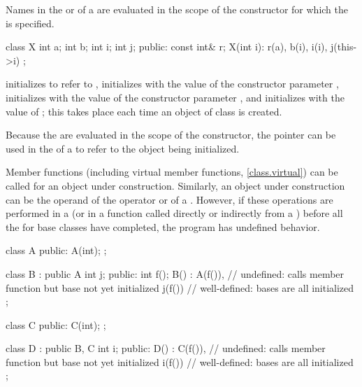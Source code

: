\pnum
{}%
Names in the
or 
of a
are evaluated in the scope of the constructor for which the
is specified.
\begin{example}

\begin{codeblock}
class X {
  int a;
  int b;
  int i;
  int j;
public:
  const int& r;
  X(int i): r(a), b(i), i(i), j(this->i) { }
};
\end{codeblock}

initializes
to refer to
,
initializes
with the value of the constructor parameter
,
initializes
with the value of the constructor parameter
,
and initializes
with the value of
;
this takes place each time an object of class
is created.
\end{example}
\begin{note}
Because the
are evaluated in the scope of the constructor, the
pointer can be used in the
of a
to refer to the object being initialized.
\end{note}

\pnum
{}%
Member functions (including virtual member functions, \ref{class.virtual}) can be
called for an object under construction.
Similarly, an object under construction can be the operand of the
operator or of a
.
However, if these operations are performed in a
(or in a function called directly or indirectly from a
)
before all the
for base classes have completed, the program has undefined behavior.
\begin{example}
\begin{codeblock}
class A {
public:
  A(int);
};

class B : public A {
  int j;
public:
  int f();
  B() : A(f()),     // undefined: calls member function but base  not yet initialized
  j(f()) { }        // well-defined: bases are all initialized
};

class C {
public:
  C(int);
};

class D : public B, C {
  int i;
public:
  D() : C(f()),     // undefined: calls member function but base  not yet initialized
  i(f()) { }        // well-defined: bases are all initialized
};
\end{codeblock}
\end{example}

